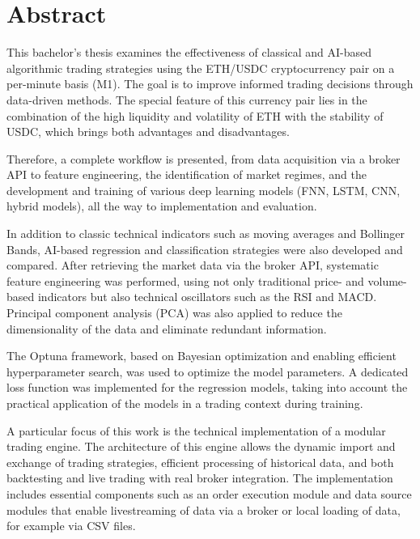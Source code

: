 \fancyfoot[C]{}
\vspace{0.7cm}

\section*{Abstract}

\vspace{0.5cm}

This bachelor's thesis examines the effectiveness of classical and AI-based algorithmic trading strategies using the ETH/USDC cryptocurrency pair on a per-minute basis (M1).
The goal is to improve informed trading decisions through data-driven methods.
The special feature of this currency pair lies in the combination of the high liquidity and volatility of ETH with the stability of USDC, which brings both advantages and disadvantages.


Therefore, a complete workflow is presented, from data acquisition via a broker API to feature engineering, the identification of market regimes, and the development and training of various deep learning models (FNN, LSTM, CNN, hybrid models), all the way to implementation and evaluation.

In addition to classic technical indicators such as moving averages and Bollinger Bands, AI-based regression and classification strategies were also developed and compared.
After retrieving the market data via the broker API, systematic feature engineering was performed, using not only traditional price- and volume-based indicators but also technical oscillators such as the RSI and MACD.
Principal component analysis (PCA) was also applied to reduce the dimensionality of the data and eliminate redundant information.


The Optuna framework, based on Bayesian optimization and enabling efficient hyperparameter search, was used to optimize the model parameters.
A dedicated loss function was implemented for the regression models, taking into account the practical application of the models in a trading context during training.


A particular focus of this work is the technical implementation of a modular trading engine.
The architecture of this engine allows the dynamic import and exchange of trading strategies, efficient processing of historical data, and both backtesting and live trading with real broker integration.
The implementation includes essential components such as an order execution module and data source modules that enable livestreaming of data via a broker or local loading of data, for example via CSV files.


